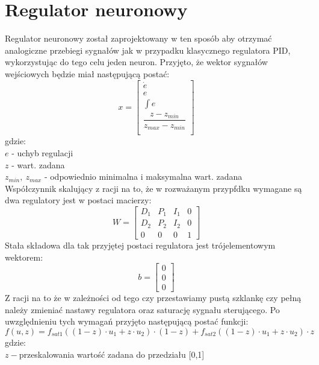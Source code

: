 \chapter{Regulator neuronowy}
Regulator neuronowy został zaprojektowany w ten sposób aby otrzymać analogiczne przebiegi sygnałów jak w przypadku klasycznego regulatora PID, wykorzystując do tego celu jeden neuron. Przyjęto, że wektor sygnałów wejściowych będzie miał następującą postać: 
\begin{equation}\label{key}
x = \begin{bmatrix}
\dot {e}\\
e\\
\int e\\
\dfrac{z-z_{min}}{z_{max} - z_{min}}\\
\end{bmatrix}
\end{equation}
gdzie:\\
$e$ - uchyb regulacji\\
$z$ - wart. zadana\\
$z_{min}, \ z_{max}$ - odpowiednio minimalna i maksymalna wart. zadana\\
Współczynnik skalujący z racji na to, że w rozważanym przypfdku wymagane są dwa regulatory jest w postaci macierzy: 
\begin{equation}\label{key}
W = \begin{bmatrix}
D_1& P_1& I_1&0\\
D_2& P_2& I_2&0\\
0&0&0&1
\end{bmatrix}
\end{equation} 
Stała składowa dla tak przyjętej postaci regulatora jest trójelementowym wektorem:
\begin{equation}\label{key}
b = \begin{bmatrix}
0\\0\\0
\end{bmatrix}
\end{equation}
Z racji na to że w zależności od tego czy przestawiamy pustą szklankę czy pełną należy zmieniać nastawy regulatora oraz saturację sygnału sterującego. Po uwzględnieniu tych wymagań przyjęto następującą postać funkcji:
\begin{equation}\label{key}
f(u,z) = f_{sat1} ((1-z) \cdot u_1 + z \cdot u_2) \cdot (1-z) + f_{sat2} ((1-z) \cdot u_1 + z \cdot u_2) \cdot z
\end{equation}
gdzie: \\
$z - $przeskalowania wartość zadana do przedziału [0,1]\\
